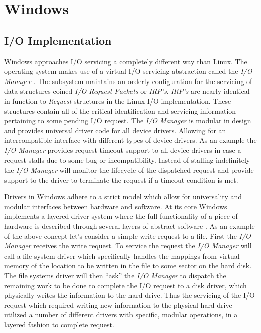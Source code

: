 \section{\bf Windows}

  \subsection{\bf I/O Implementation}
  \normalfont \indent Windows approaches I/O servicing a completely different way than Linux. The operating system makes use of a virtual I/O servicing abstraction called the \textit{I/O Manager} \cite{windowsInternals}. The subsystem maintains an orderly configuration for the servicing of data structures coined \textit{I/O Request Packets} or \textit{IRP’s}. \textit{IRP’s} are nearly identical in function to \textit{Request} structures in the Linux I/O implementation. These structures contain all of the critical identification and servicing information pertaining to some pending I/O request. The \textit{I/O Manager} is modular in design and provides universal driver code for all device drivers. Allowing for an intercompatible interface with different types of device drivers. As an example the \textit{I/O Manager} provides request timeout support to all device drivers in case a request stalls due to some bug or incompatibility. Instead of stalling indefinitely the \textit{I/O Manager} will monitor the lifecycle of the dispatched request and provide support to the driver to terminate the request if a timeout condition is met.

  \normalfont \indent Drivers in Windows adhere to a strict model which allow for universality and modular interfaces between hardware and software. At its core Windows implements a layered driver system where the full functionality of a piece of hardware is described through several layers of abstract software \cite{windowsInternals}. As an example of the above concept let's consider a simple write request to a file. First the \textit{I/O Manager} receives the write request. To service the request the \textit{I/O Manager} will call a file system driver which specifically handles the mappings from virtual memory of the location to be written in the file to some sector on the hard disk. The file systems driver will then “ask” the \textit{I/O Manager} to dispatch the remaining work to be done to complete the I/O request to a disk driver, which physically writes the information to the hard drive. Thus the servicing of the I/O request which required writing new information to the physical hard drive utilized a number of different drivers with specific, modular operations, in a layered fashion to complete request.

